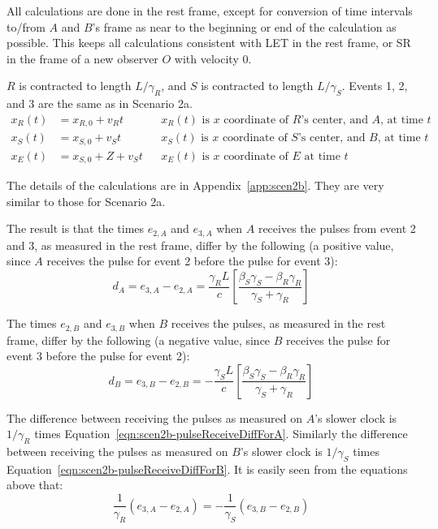 \documentclass[a4paper]{article}
\theoremstyle{plain}
\theoremstyle{definition}
\begin{document}
All calculations are done in the rest frame, except for conversion of
time intervals to/from $A$ and $B$'s frame as near to the beginning or
end of the calculation as possible.  This keeps all calculations
consistent with LET in the rest frame, or SR in the frame of a new
observer $O$ with velocity 0.

$R$ is contracted to length $L/\gamma_{R}$,
and $S$ is contracted to length $L/\gamma_{S}$.
Events 1, 2, and 3 are the same as in Scenario 2a.
\begin{align}
x_R(t) & = x_{R,0} + v_R t & & \text{$x_R(t)$ is $x$ coordinate of $R$'s center, and $A$, at time $t$} \label{eqn:scen2b-R-xcoord} \\
x_S(t) & = x_{S,0} + v_S t & & \text{$x_S(t)$ is $x$ coordinate of $S$'s center, and $B$, at time $t$} \label{eqn:scen2b-S-xcoord} \\
x_E(t) & = x_{S,0} + Z + v_S t & & \text{$x_E(t)$ is $x$ coordinate of $E$ at time $t$} \label{eqn:scen2b-E-xcoord}
\end{align}

The details of the calculations are in Appendix~\ref{app:scen2b}.
They are very similar to those for Scenario 2a.

The result is that the times $e_{2,A}$ and $e_{3,A}$ when $A$ receives
the pulses from event 2 and 3, as measured in the rest frame, differ
by the following (a positive value, since $A$ receives the pulse for
event 2 before the pulse for event 3):
\begin{equation}
d_A
  = e_{3,A}-e_{2,A}
  = \frac{\gamma_R L}{c} \left[ \frac{\beta_S\gamma_S - \beta_R\gamma_R}{\gamma_S + \gamma_R} \right] \label{eqn:scen2b-pulseReceiveDiffForA}
\end{equation}

The times $e_{2,B}$ and $e_{3,B}$ when $B$ receives the pulses, as
measured in the rest frame, differ by the following (a negative value,
since $B$ receives the pulse for event 3 before the pulse for event
2):
\begin{equation}
d_B
  = e_{3,B}-e_{2,B}
  = -\frac{\gamma_S L}{c} \left[ \frac{\beta_S\gamma_S - \beta_R\gamma_R}{\gamma_S + \gamma_R} \right] \label{eqn:scen2b-pulseReceiveDiffForB}
\end{equation}

The difference between receiving the pulses as measured on $A$'s
slower clock is $1/\gamma_R$ times
Equation~\eqref{eqn:scen2b-pulseReceiveDiffForA}.  Similarly the
difference between receiving the pulses as measured on $B$'s slower
clock is $1/\gamma_S$ times
Equation~\eqref{eqn:scen2b-pulseReceiveDiffForB}.  It is easily seen
from the equations above that:
\begin{equation}
\frac{1}{\gamma_R} (e_{3,A}-e_{2,A}) = -\frac{1}{\gamma_S} (e_{3,B}-e_{2,B})
\end{equation}
\end{document}
